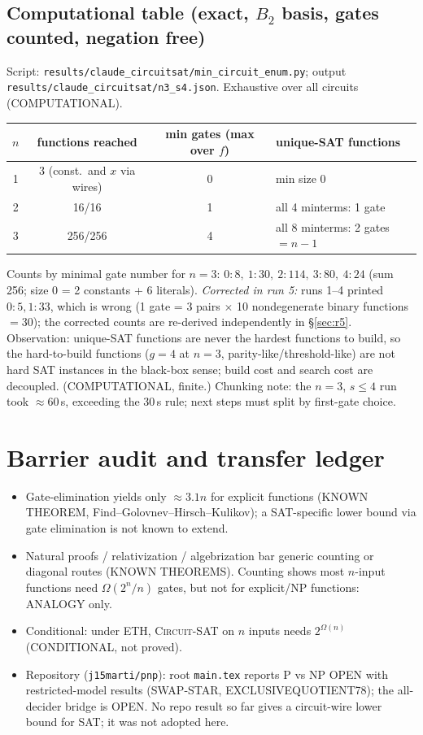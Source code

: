\documentclass[11pt]{article}
\newcommand{\SAT}{\textsc{Circuit-SAT}}
\begin{document}
\subsection{Computational table (exact, $B_2$ basis, gates counted, negation free)}
Script: \texttt{results/claude\_circuitsat/min\_circuit\_enum.py}; output
\texttt{results/claude\_circuitsat/n3\_s4.json}. Exhaustive over all circuits (COMPUTATIONAL).
\begin{center}\begin{tabular}{@{}cccl@{}}\toprule
$n$ & functions reached & min gates (max over $f$) & unique-SAT functions\\\midrule
1 & 3 (const.\ and $x$ via wires) & 0 & min size 0\\
2 & 16/16 & 1 & all 4 minterms: 1 gate\\
3 & 256/256 & 4 & all 8 minterms: 2 gates $=n-1$\\\bottomrule
\end{tabular}\end{center}
Counts by minimal gate number for $n=3$: $0{:}8,\ 1{:}30,\ 2{:}114,\ 3{:}80,\ 4{:}24$ (sum 256; size 0 = 2 constants + 6 literals).
\emph{Corrected in run 5:} runs 1--4 printed $0{:}5,1{:}33$, which is wrong (1 gate = $3$ pairs $\times$ 10 nondegenerate binary functions $=30$); the corrected counts are re-derived independently in \S\ref{sec:r5}.
Observation: unique-SAT functions are never the hardest functions to build, so the
hard-to-build functions ($g=4$ at $n=3$, parity-like/threshold-like) are not hard SAT instances in the black-box
sense; build cost and search cost are decoupled. (COMPUTATIONAL, finite.)
Chunking note: the $n=3$, $s\le4$ run took $\approx 60$\,s, exceeding the 30\,s rule; next steps must split by first-gate choice.

\section{Barrier audit and transfer ledger}
\begin{itemize}
\item Gate-elimination yields only $\approx 3.1n$ for explicit functions (KNOWN THEOREM, Find--Golovnev--Hirsch--Kulikov); a SAT-specific lower bound via gate elimination is not known to extend.
\item Natural proofs / relativization / algebrization bar generic counting or diagonal routes (KNOWN THEOREMS). Counting shows most $n$-input functions need $\Omega(2^n/n)$ gates, but not for explicit/NP functions: ANALOGY only.
\item Conditional: under ETH, \SAT{} on $n$ inputs needs $2^{\Omega(n)}$ (CONDITIONAL, not proved).
\item Repository (\texttt{j15marti/pnp}): root \texttt{main.tex} reports P vs NP OPEN with restricted-model results (SWAP-STAR, EXCLUSIVEQUOTIENT78); the all-decider bridge is OPEN. No repo result so far gives a circuit-wire lower bound for SAT; it was not adopted here.
\end{itemize}
\end{document}
